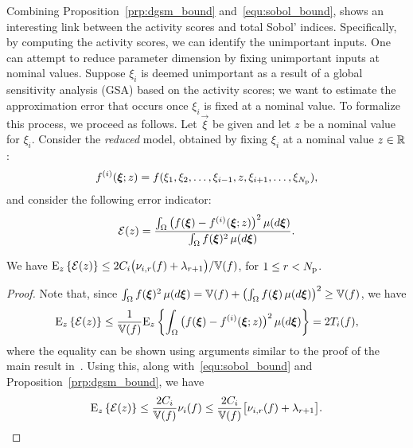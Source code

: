 Combining Proposition~\ref{prp:dgsm_bound} and~\eqref{equ:sobol_bound}, shows
an interesting link between the activity scores and total Sobol' indices.
Specifically, by computing the activity scores, we can identify the unimportant
inputs.  
One can attempt to reduce parameter dimension by fixing
unimportant inputs at nominal values. Suppose $\xi_i$ is
deemed unimportant as a result of a global sensitivity analysis (GSA)
based on the activity scores; we want to estimate
the approximation error that occurs once $\xi_i$ 
is fixed at a nominal value.
%
To formalize this process, we proceed as follows.
Let $\vec\xi$ be given and let $z$ be a nominal value for $\xi_i$.  
Consider the \emph{reduced} model, 
obtained by fixing $\xi_i$ at a nominal value $z \in \R$: 
\[
\redf{i}{z} = f(\xi_1, \xi_2, \ldots, \xi_{i-1}, z, \xi_{i+1}, \ldots, \xi_\Np),
\] 
and consider the following error indicator:
\[
\mathcal{E}(z) =
\frac{ \int_\Omega \big( f(\vec\xi) - \redf{i}{z}\big)^2 \, \mu(d\vec\xi) }
          {\int_\Omega f(\vec\xi)^2 \, \mu(d\vec\xi)}.
\] 
\begin{theorem}
We have $\Ez{ \mathcal{E}(z)} \leq 2C_i\big(\act{f}{i}{r} + \lambda_{r+1}\big)/{\V(f)}$, 
for $1 \leq r < \Np$.
\end{theorem}
%
\begin{proof} 
Note that, since 
$\int_\Omega f(\vec\xi)^2 \, \mu(d\vec\xi) = \V(f) + 
\left(\int_\Omega f(\vec\xi) \, \mu(d\vec\xi)\right)^2 \geq \V(f)$, we have
\[
\Ez{ \mathcal{E}(z)} \leq \frac{1}{\V(f)} \Ez{ 
\int_\Omega \big( f(\vec\xi) - \redf{i}{z}\big)^2 \, \mu(d\vec\xi)}
= 2 T_i(f), 
\]
where the equality can be shown using arguments similar to the proof of the main result 
in~\cite{SobolTarantolaGatelliEtAl07}. Using this, along with~\eqref{equ:sobol_bound} and
Proposition~\ref{prp:dgsm_bound}, we have 
\[
\Ez{ \mathcal{E}(z)} \leq 
\frac{2C_i}{\V(f)}\nu_i(f)
\leq 
\frac{2C_i}{\V(f)}\big[\act{f}{i}{r} + \lambda_{r+1}\big]. \qedhere
\]
\end{proof}

